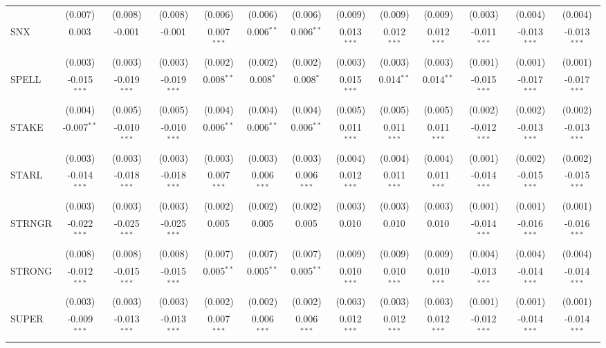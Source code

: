 \begin{table}[!htbp]
\begin{tabular}{@{\extracolsep{5pt}}lcccccccccccc}
  & (0.007) & (0.008) & (0.008) & (0.006) & (0.006) & (0.006) & (0.009) & (0.009) & (0.009) & (0.003) & (0.004) & (0.004) \\
 SNX & 0.003$^{}$ & -0.001$^{}$ & -0.001$^{}$ & 0.007$^{***}$ & 0.006$^{**}$ & 0.006$^{**}$ & 0.013$^{***}$ & 0.012$^{***}$ & 0.012$^{***}$ & -0.011$^{***}$ & -0.013$^{***}$ & -0.013$^{***}$ \\
  & (0.003) & (0.003) & (0.003) & (0.002) & (0.002) & (0.002) & (0.003) & (0.003) & (0.003) & (0.001) & (0.001) & (0.001) \\
 SPELL & -0.015$^{***}$ & -0.019$^{***}$ & -0.019$^{***}$ & 0.008$^{**}$ & 0.008$^{*}$ & 0.008$^{*}$ & 0.015$^{***}$ & 0.014$^{**}$ & 0.014$^{**}$ & -0.015$^{***}$ & -0.017$^{***}$ & -0.017$^{***}$ \\
  & (0.004) & (0.005) & (0.005) & (0.004) & (0.004) & (0.004) & (0.005) & (0.005) & (0.005) & (0.002) & (0.002) & (0.002) \\
 STAKE & -0.007$^{**}$ & -0.010$^{***}$ & -0.010$^{***}$ & 0.006$^{**}$ & 0.006$^{**}$ & 0.006$^{**}$ & 0.011$^{***}$ & 0.011$^{***}$ & 0.011$^{***}$ & -0.012$^{***}$ & -0.013$^{***}$ & -0.013$^{***}$ \\
  & (0.003) & (0.003) & (0.003) & (0.003) & (0.003) & (0.003) & (0.004) & (0.004) & (0.004) & (0.001) & (0.002) & (0.002) \\
 STARL & -0.014$^{***}$ & -0.018$^{***}$ & -0.018$^{***}$ & 0.007$^{***}$ & 0.006$^{***}$ & 0.006$^{***}$ & 0.012$^{***}$ & 0.011$^{***}$ & 0.011$^{***}$ & -0.014$^{***}$ & -0.015$^{***}$ & -0.015$^{***}$ \\
  & (0.003) & (0.003) & (0.003) & (0.002) & (0.002) & (0.002) & (0.003) & (0.003) & (0.003) & (0.001) & (0.001) & (0.001) \\
 STRNGR & -0.022$^{***}$ & -0.025$^{***}$ & -0.025$^{***}$ & 0.005$^{}$ & 0.005$^{}$ & 0.005$^{}$ & 0.010$^{}$ & 0.010$^{}$ & 0.010$^{}$ & -0.014$^{***}$ & -0.016$^{***}$ & -0.016$^{***}$ \\
  & (0.008) & (0.008) & (0.008) & (0.007) & (0.007) & (0.007) & (0.009) & (0.009) & (0.009) & (0.004) & (0.004) & (0.004) \\
 STRONG & -0.012$^{***}$ & -0.015$^{***}$ & -0.015$^{***}$ & 0.005$^{**}$ & 0.005$^{**}$ & 0.005$^{**}$ & 0.010$^{***}$ & 0.010$^{***}$ & 0.010$^{***}$ & -0.013$^{***}$ & -0.014$^{***}$ & -0.014$^{***}$ \\
  & (0.003) & (0.003) & (0.003) & (0.002) & (0.002) & (0.002) & (0.003) & (0.003) & (0.003) & (0.001) & (0.001) & (0.001) \\
 SUPER & -0.009$^{***}$ & -0.013$^{***}$ & -0.013$^{***}$ & 0.007$^{***}$ & 0.006$^{***}$ & 0.006$^{***}$ & 0.012$^{***}$ & 0.012$^{***}$ & 0.012$^{***}$ & -0.012$^{***}$ & -0.014$^{***}$ & -0.014$^{***}$ \\

\end{tabular}
\end{table}
